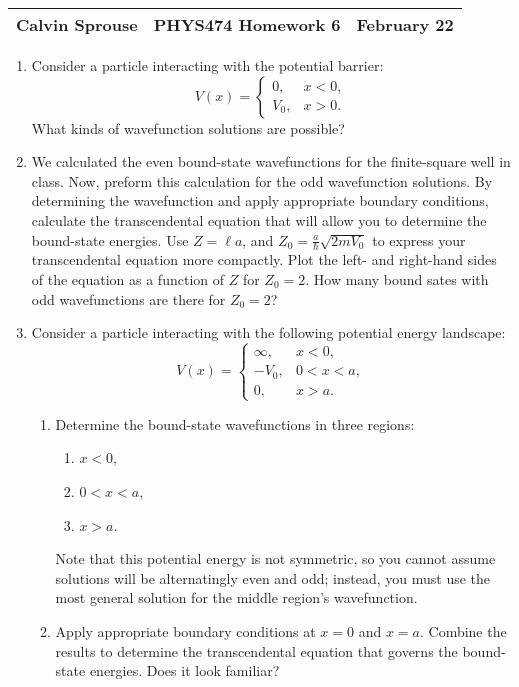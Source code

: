 \documentclass[a4paper, 12pt]{config/homework}
\begin{document}
\noindent
\begin{tabularx}{\textwidth}{>{\centering\arraybackslash}X>{\centering\arraybackslash}X>{\centering\arraybackslash}X}
Calvin Sprouse & PHYS474 Homework 6 & 2024 February 22\\
\midrule
\end{tabularx}

\begin{enumerate}
\item Consider a particle interacting with the potential barrier:
\[V(x) = \begin{cases}
0, & x < 0, \\ V_0, & x > 0.
\end{cases}\]
What kinds of wavefunction solutions are possible?



\pagebreak
\item We calculated the even bound-state wavefunctions for the finite-square well in class. Now, preform this calculation for the odd wavefunction solutions. By determining the wavefunction and apply appropriate boundary conditions, calculate the transcendental equation that will allow you to determine the bound-state energies. Use \(Z = \ell a\), and \(Z_0 = \frac{a}{\hbar}\sqrt{2mV_0}\) to express your transcendental equation more compactly.
Plot the left- and right-hand sides of the equation as a function of \(Z\) for \(Z_0=2\). How many bound sates with odd wavefunctions are there for \(Z_0=2\)?



\pagebreak
\item Consider a particle interacting with the following potential energy landscape:
\[V(x) = \begin{cases}
\infty, & x < 0, \\ -V_0, & 0 < x < a, \\ 0, & x > a.
\end{cases}\]
\begin{enumerate}[label=(\alph*.)]
\item Determine the bound-state wavefunctions in three regions:
\begin{enumerate}[label=(\roman*.)]
\item \(x < 0\),
\item \(0 < x < a\),
\item \(x > a\).
\end{enumerate}
Note that this potential energy is not symmetric, so you cannot assume solutions will be alternatingly even and odd; instead, you must use the most general solution for the middle region's wavefunction.



\item Apply appropriate boundary conditions at \(x=0\) and \(x=a\). Combine the results to determine the transcendental equation that governs the bound-state energies. Does it look familiar?



\end{enumerate}
\end{enumerate}
\end{document}
